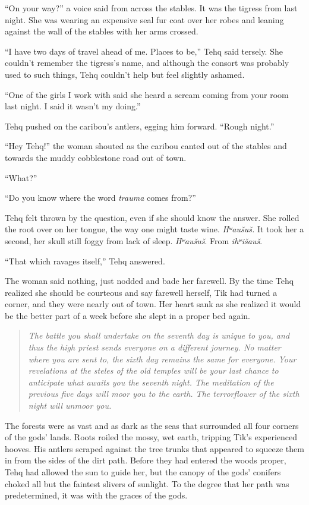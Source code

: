 ``On your way?'' a voice said from across the stables. It was the tigress from last night. She was wearing an expensive seal fur coat over her robes and leaning against the wall of the stables with her arms crossed.

``I have two days of travel ahead of me. Places to be,'' Tehq said tersely. She couldn't remember the tigress's name, and although the consort was probably used to such things, Tehq couldn't help but feel slightly ashamed.

``One of the girls I work with said she heard a scream coming from your room last night. I said it wasn't my doing.''

Tehq pushed on the caribou's antlers, egging him forward. ``Rough night.''

``Hey Tehq!'' the woman shouted as the caribou canted out of the stables and towards the muddy cobblestone road out of town.

``What?''

``Do you know where the word \emph{trauma} comes from?''

Tehq felt thrown by the question, even if she should know the answer. She rolled the root over on her tongue, the way one might taste wine. \emph{Hʷaušuš.} It took her a second, her skull still foggy from lack of sleep. \emph{Hʷaušuš}. From \emph{ihʷišauš}.

``That which ravages itself,'' Tehq answered.

The woman said nothing, just nodded and bade her farewell. By the time Tehq realized she should be courteous and say farewell herself, Tik had turned a corner, and they were nearly out of town. Her heart sank as she realized it would be the better part of a week before she slept in a proper bed again.

\begin{quote}
\emph{The battle you shall undertake on the seventh day is unique to you, and thus the high priest sends everyone on a different journey. No matter where you are sent to, the sixth day remains the same for everyone. Your revelations at the steles of the old temples will be your last chance to anticipate what awaits you the seventh night. The meditation of the previous five days will moor you to the earth. The terrorflower of the sixth night will unmoor you.}
\end{quote}

The forests were as vast and as dark as the seas that surrounded all four corners of the gods' lands. Roots roiled the mossy, wet earth, tripping Tik's experienced hooves. His antlers scraped against the tree trunks that appeared to squeeze them in from the sides of the dirt path. Before they had entered the woods proper, Tehq had allowed the sun to guide her, but the canopy of the gods' conifers choked all but the faintest slivers of sunlight. To the degree that her path was predetermined, it was with the graces of the gods.

